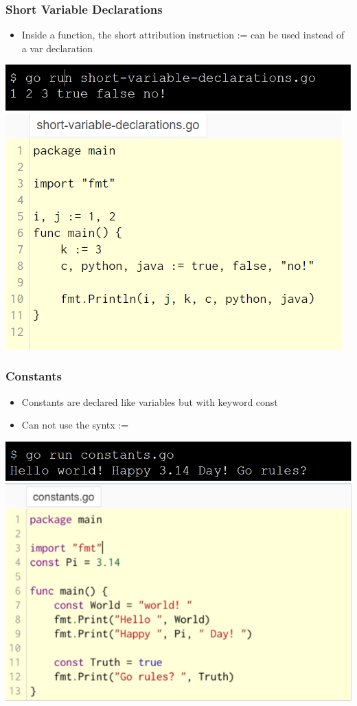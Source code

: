 \documentclass[14pt]{beamer}
\begin{document}
{
\begin{frame}
    \frametitle{Short Variable Declarations}
    \begin{itemize}
\item Inside a function, the short attribution instruction := can be used instead of a var declaration
    \end{itemize}
    \begin{center}
        \includegraphics[width=0.6\linewidth]{img/shortdeclarationcommand.PNG}
        \includegraphics[width=0.6\linewidth]{img/shortdeclaration.PNG}
    \end{center}
\end{frame}
}

{
\begin{frame}
    \frametitle{Constants}
    \begin{itemize}
\item Constants are declared like variables but with keyword const
\item Can not use the syntx :=
    \end{itemize}
    \begin{center}
    \includegraphics[width=0.6\linewidth]{img/constants.PNG}
    \end{center}
\end{frame}
}
\end{document}
